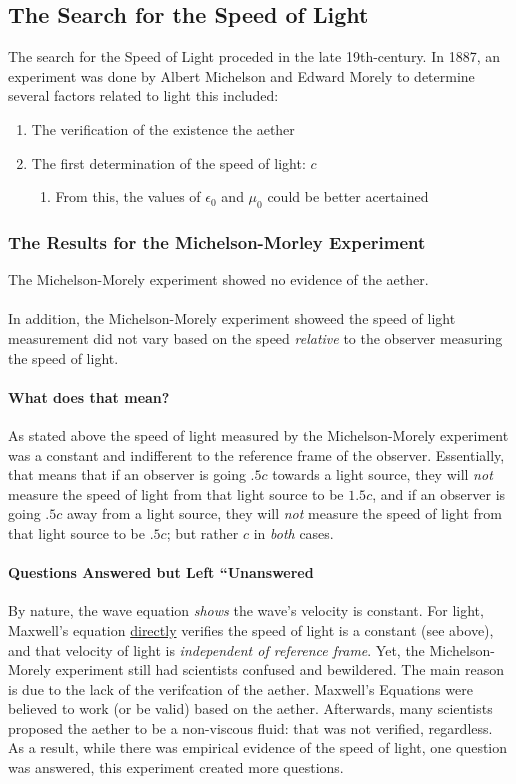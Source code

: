 \documentclass[journal]{IEEEtran}
\begin{document}
\subsection{The Search for the Speed of Light}
The search for the Speed of Light proceded in the late 19th-century.
In 1887, an experiment was done by Albert Michelson and Edward
Morely to determine several factors related to light this included:
\begin{enumerate}
\item The verification of the existence the aether
\item The first determination of the speed of light: $c$
\begin{enumerate}
\item From this, the values of $\epsilon_0$ and $\mu_0$ could be
better acertained
\end{enumerate}
\end{enumerate}
\subsubsection{The Results for the Michelson-Morley Experiment}
The Michelson-Morely experiment showed no evidence of the aether.
\\\\In
addition, the Michelson-Morely experiment showeed the speed of light
measurement did not vary based on the speed \emph{relative} to the
observer measuring the speed of light.
\paragraph{What does that mean?}  As stated above the speed of light
measured by the Michelson-Morely experiment was a constant and
indifferent to the reference frame of the observer.  Essentially, that
means that if an observer is going $.5c$ towards a light source, they
will \emph{not} measure the speed of light from that light source to
be $1.5c$, and if an
observer is going $.5c$ away from a light source, they will \emph{not}
measure the speed of light from that light source to be $.5c$; but
rather $c$ in \emph{both}
cases.
\paragraph{Questions Answered but Left ``Unanswered}By nature, the
wave equation \emph{shows} the wave's velocity is constant.  For
light, Maxwell's equation \underline{directly} verifies the speed of
light is a constant (see above), and that velocity of light is
\emph{independent of reference frame}.  Yet, the Michelson-Morely
experiment still had scientists confused and bewildered.  The main
reason is due to the lack of the verifcation of the aether.  Maxwell's
Equations were believed to work (or be valid) based on the aether.
Afterwards, many scientists proposed the aether to be a non-viscous
fluid:  that was not verified, regardless. As a
result, while there was empirical evidence of the speed of light,
one question was answered, this experiment created more questions.
\end{document}
